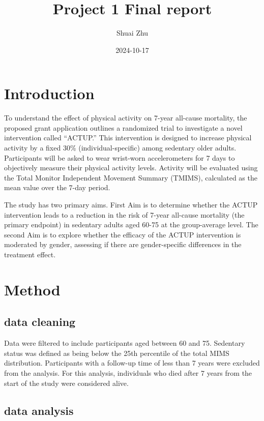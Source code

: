 \documentclass[
  12pt,
]{article}
\title{Project 1 Final report}
\author{Shuai Zhu}
\date{2024-10-17}
\begin{document}
\maketitle

\hypertarget{introduction}{%
\section{Introduction}\label{introduction}}

To understand the effect of physical activity on 7-year all-cause
mortality, the proposed grant application outlines a randomized trial to
investigate a novel intervention called ``ACTUP.'' This intervention is
designed to increase physical activity by a fixed 30\%
(individual-specific) among sedentary older adults. Participants will be
asked to wear wrist-worn accelerometers for 7 days to objectively
measure their physical activity levels. Activity will be evaluated using
the Total Monitor Independent Movement Summary (TMIMS), calculated as
the mean value over the 7-day period.

The study has two primary aims. First Aim is to determine whether the
ACTUP intervention leads to a reduction in the risk of 7-year all-cause
mortality (the primary endpoint) in sedentary adults aged 60-75 at the
group-average level. The second Aim is to explore whether the efficacy
of the ACTUP intervention is moderated by gender, assessing if there are
gender-specific differences in the treatment effect.

\hypertarget{method}{%
\section{Method}\label{method}}

\hypertarget{data-cleaning}{%
\subsection{data cleaning}\label{data-cleaning}}

Data were filtered to include participants aged between 60 and 75.
Sedentary status was defined as being below the 25th percentile of the
total MIMS distribution. Participants with a follow-up time of less than
7 years were excluded from the analysis. For this analysis, individuals
who died after 7 years from the start of the study were considered
alive.

\hypertarget{data-analysis}{%
\subsection{data analysis}\label{data-analysis}}
\end{document}
